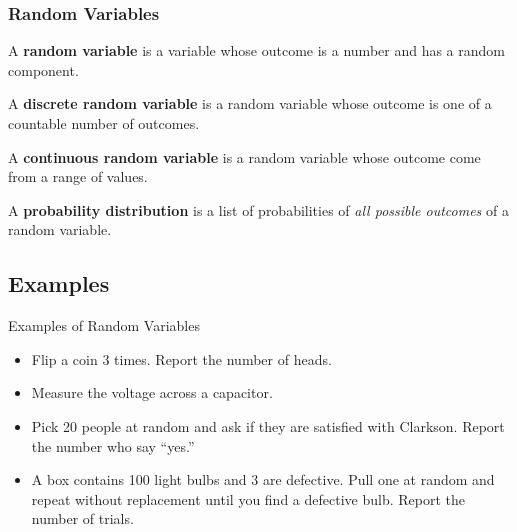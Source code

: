 \begin{frame}
  \frametitle{Random Variables}

  \begin{definition}
    A \textbf{random variable} is a variable whose outcome is a number
    and has a random component.
  \end{definition}

  {
    \begin{definition}
      A \textbf{discrete random variable} is a random variable whose
      outcome is one of a countable number of outcomes.
    \end{definition}
  }

  {
    \begin{definition}
      A \textbf{continuous random variable} is a random variable whose
      outcome come from a range of values.
    \end{definition}
  }

  {
    \begin{definition}
      A \textbf{probability distribution} is a list of probabilities of
      \textit{all possible outcomes} of a random variable.
    \end{definition}
  }

\end{frame}

\subsection{Examples}

\begin{frame}{Examples of Random Variables}

  \begin{itemize}
  \item Flip a coin 3 times. Report the number of heads.
  \item Measure the voltage across a capacitor.
  \item Pick 20 people at random and ask if they are satisfied with
    Clarkson. Report the number who say ``yes.''
  \item A box contains 100 light bulbs and 3 are defective. Pull one
    at random and repeat without replacement until you find a
    defective bulb. Report the number of trials.
  \end{itemize}
  
\end{frame}



